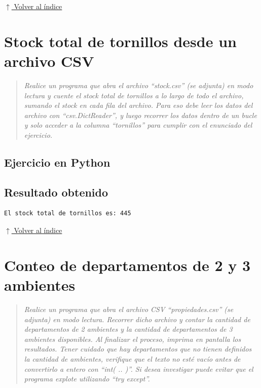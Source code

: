 \documentclass[12pt]{article}
\newcommand{\codigopython}[2]{%
}
\newcommand{\volverindice}{%
    \vspace{1em}%
    \begin{flushright}%
        \hyperlink{indice}{\small $\uparrow$ Volver al índice}%
    \end{flushright}%
}
\newcommand{\enunciado}[1]{%
    \begin{quote}
        \itshape #1
    \end{quote}
}
\begin{document}
\volverindice
\newpage


\section{Stock total de tornillos desde un archivo CSV}

\enunciado{Realice un programa que abra el archivo \enquote{stock.csv} (se adjunta) en modo lectura y cuente el stock total de tornillos a lo largo de todo el archivo, sumando el stock en cada fila del archivo. Para eso debe leer los datos del archivo con \enquote{csv.DictReader}, y luego recorrer los datos dentro de un bucle y solo acceder a la columna \enquote{tornillos} para cumplir con el enunciado del ejercicio.}

\subsection*{Ejercicio en Python}

\codigopython{03}{Stock total de tornillos desde un archivo CSV}

\subsection*{Resultado obtenido}

\begin{lstlisting}[style=salida]
El stock total de tornillos es: 445
\end{lstlisting}

\volverindice
\newpage


\section{Conteo de departamentos de 2 y 3 ambientes}

\enunciado{Realice un programa que abra el archivo CSV \enquote{propiedades.csv} (se adjunta) en modo lectura. Recorrer dicho archivo y contar la cantidad de departamentos de 2 ambientes y la cantidad de departamentos de 3 ambientes disponibles. Al finalizar el proceso, imprima en pantalla los resultados. Tener cuidado que hay departamentos que no tienen definidos la cantidad de ambientes, verifique que el texto no esté vacío antes de convertirlo a entero con \enquote{int( .. )}. Si desea investigar puede evitar que el programa explote utilizando \enquote{try except}.}
\end{document}
